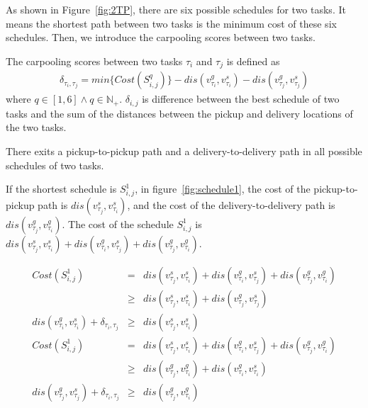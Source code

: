 \documentclass[sigconf,anonymous]{aamas}
\begin{document}
As shown in Figure~\ref{fig:2TP}, there are six possible schedules for two tasks.
It means the shortest path between two tasks is the minimum cost of these six schedules.
Then, we introduce the carpooling scores between two tasks.

\begin{definition}
    \label{cp2}
        The carpooling scores between two tasks $\tau_{i}$ and $\tau_{j}$ is defined as 
        \begin{eqnarray}
        \label{eq:cp2}
            \delta_{\tau_{i}, \tau_{j}} = min\{Cost(S^{q}_{i,j})\} - 
            dis(v^{g}_{\tau_{i}}, v^{s}_{\tau_{i}}) - dis(v^{g}_{\tau_{j}}, v^{s}_{\tau_{j}})
        \end{eqnarray}
        where $q \in [1, 6] \wedge q \in \mathbb{N_+}$. $\delta_{i,j}$ is difference 
        between the best schedule of two tasks 
        and the sum of the distances between the pickup and delivery locations of the two tasks.
    \end{definition}

There exits a pickup-to-pickup path and a delivery-to-delivery path in all possible schedules of two tasks.

If the shortest schedule is $S^1_{i,j}$,
in figure~\ref{fig:schedule1},
the cost of the pickup-to-pickup path is $dis(v^{s}_{\tau_{j}}, v^{s}_{\tau_{i}})$,
and the cost of the delivery-to-delivery path is $dis(v^{g}_{\tau_{j}}, v^{g}_{\tau_{i}})$.
The cost of the schedule $S^1_{i,j}$ is $dis(v^{s}_{\tau_{j}}, v^{s}_{\tau_{i}})
+ dis(v^{g}_{\tau_{i}}, v^{s}_{\tau_{j}}) + dis(v^{g}_{\tau_{j}}, v^{g}_{\tau_{i}})$.

\begin{eqnarray}
    \label{eq:cost1}
    Cost(S^{1}_{i,j}) &=& dis(v^s_{\tau_j}, v^s_{\tau_i})+dis(v^g_{\tau_i}, v^s_{\tau_j})
      +dis(v^g_{\tau_j}, v^g_{\tau_i}) \nonumber \\
    & \geq & dis(v^s_{\tau_j}, v^s_{\tau_i})+ dis(v^g_{\tau_j}, v^s_{\tau_j}) \nonumber \\
    dis(v^g_{\tau_i}, v^s_{\tau_i})+\delta_{\tau_i, \tau_j} &\geq& dis(v^s_{\tau_j}, v^s_{\tau_i}) \label{eq:p2p1}\\
    Cost(S^{1}_{i,j}) &=& dis(v^s_{\tau_j}, v^s_{\tau_i})+dis(v^g_{\tau_i}, v^s_{\tau_j})
      +dis(v^g_{\tau_j}, v^g_{\tau_i}) \nonumber \\
    & \geq & dis(v^g_{\tau_j}, v^g_{\tau_i})+ dis(v^g_{\tau_i}, v^s_{\tau_i}) \nonumber \\
    dis(v^g_{\tau_j}, v^s_{\tau_j})+\delta_{\tau_i, \tau_j} &\geq& dis(v^g_{\tau_j}, v^g_{\tau_i}) \label{eq:d2d1}
\end{eqnarray}
\end{document}
